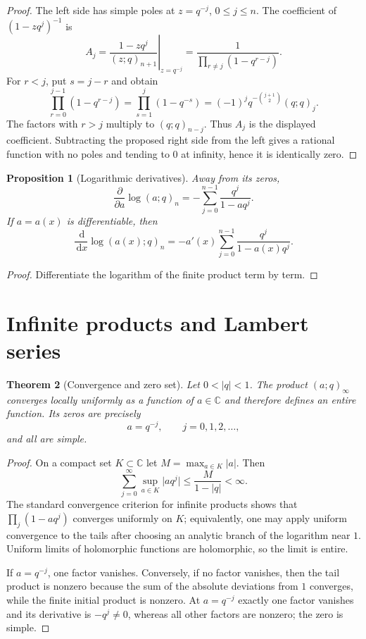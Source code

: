 \documentclass[11pt,oneside,openany]{book}
\newtheorem{theorem}{Theorem}[chapter]
\newtheorem{proposition}[theorem]{Proposition}
\theoremstyle{definition}
\theoremstyle{remark}
\newcommand{\C}{\mathbb C}
\newcommand{\dd}{\,\mathrm d}
\newcommand{\abs}[1]{\lvert #1\rvert}
\begin{document}
\begin{proof}
The left side has simple poles at $z=q^{-j}$, $0\le j\le n$.  The coefficient of $(1-zq^j)^{-1}$ is
\[
 A_j=\left.\frac{1-zq^j}{(z;q)_{n+1}}\right|_{z=q^{-j}}
 =\frac{1}{\prod_{r\ne j}(1-q^{r-j})}.
\]
For $r<j$, put $s=j-r$ and obtain
\[
 \prod_{r=0}^{j-1}(1-q^{r-j})
 =\prod_{s=1}^{j}(1-q^{-s})
 =(-1)^jq^{-\binom{j+1}{2}}(q;q)_j.
\]
The factors with $r>j$ multiply to $(q;q)_{n-j}$.  Thus $A_j$ is the displayed coefficient.  Subtracting the proposed right side from the left gives a rational function with no poles and tending to $0$ at infinity, hence it is identically zero.
\end{proof}

\begin{proposition}[Logarithmic derivatives]\label{prop:logder-finite}
Away from its zeros,
\[
 \frac{\partial}{\partial a}\log(a;q)_n
 =-\sum_{j=0}^{n-1}\frac{q^j}{1-aq^j}.
\]
If $a=a(x)$ is differentiable, then
\[
 \frac{\dd}{\dd x}\log(a(x);q)_n
 =-a'(x)\sum_{j=0}^{n-1}\frac{q^j}{1-a(x)q^j}.
\]
\end{proposition}

\begin{proof}
Differentiate the logarithm of the finite product term by term.
\end{proof}

\section{Infinite products and Lambert series}

\begin{theorem}[Convergence and zero set]\label{thm:poch-entire}
Let $0<\abs q<1$.  The product $(a;q)_\infty$ converges locally uniformly as a function of $a\in\C$ and therefore defines an entire function.  Its zeros are precisely
\[
 a=q^{-j},\qquad j=0,1,2,\ldots,
\]
and all are simple.
\end{theorem}

\begin{proof}
On a compact set $K\subset\C$ let $M=\max_{a\in K}\abs a$.  Then
\[
 \sum_{j=0}^{\infty}\sup_{a\in K}\abs{a q^j}
 \le \frac{M}{1-\abs q}<\infty.
\]
The standard convergence criterion for infinite products shows that
\(
 \prod_j(1-aq^j)
\)
converges uniformly on $K$; equivalently, one may apply uniform convergence to the tails after choosing an analytic branch of the logarithm near $1$.  Uniform limits of holomorphic functions are holomorphic, so the limit is entire.

If $a=q^{-j}$, one factor vanishes.  Conversely, if no factor vanishes, then the tail product is nonzero because the sum of the absolute deviations from $1$ converges, while the finite initial product is nonzero.  At $a=q^{-j}$ exactly one factor vanishes and its derivative is $-q^j\ne0$, whereas all other factors are nonzero; the zero is simple.
\end{proof}
\end{document}
